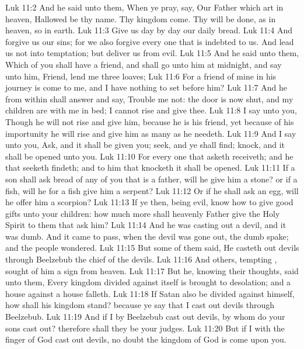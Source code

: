 \vs Luk 11:2 And he said unto them, When ye pray, say, Our Father which art in heaven, Hallowed be thy name. Thy kingdom come. Thy will be done, as in heaven, so in earth.
\vs Luk 11:3 Give us day by day our daily bread.
\vs Luk 11:4 And forgive us our sins; for we also forgive every one that is indebted to us. And lead us not into temptation; but deliver us from evil.
\vs Luk 11:5 And he said unto them, Which of you shall have a friend, and shall go unto him at midnight, and say unto him, Friend, lend me three loaves;
\vs Luk 11:6 For a friend of mine in his journey is come to me, and I have nothing to set before him?
\vs Luk 11:7 And he from within shall answer and say, Trouble me not: the door is now shut, and my children are with me in bed; I cannot rise and give thee.
\vs Luk 11:8 I say unto you, Though he will not rise and give him, because he is his friend, yet because of his importunity he will rise and give him as many as he needeth.
\vs Luk 11:9 And I say unto you, Ask, and it shall be given you; seek, and ye shall find; knock, and it shall be opened unto you.
\vs Luk 11:10 For every one that asketh receiveth; and he that seeketh findeth; and to him that knocketh it shall be opened.
\vs Luk 11:11 If a son shall ask bread of any of you that is a father, will he give him a stone? or if  a fish, will he for a fish give him a serpent?
\vs Luk 11:12 Or if he shall ask an egg, will he offer him a scorpion?
\vs Luk 11:13 If ye then, being evil, know how to give good gifts unto your children: how much more shall  heavenly Father give the Holy Spirit to them that ask him?
\vs Luk 11:14 And he was casting out a devil, and it was dumb. And it came to pass, when the devil was gone out, the dumb spake; and the people wondered.
\vs Luk 11:15 But some of them said, He casteth out devils through Beelzebub the chief of the devils.
\vs Luk 11:16 And others, tempting , sought of him a sign from heaven.
\vs Luk 11:17 But he, knowing their thoughts, said unto them, Every kingdom divided against itself is brought to desolation; and a house  against a house falleth.
\vs Luk 11:18 If Satan also be divided against himself, how shall his kingdom stand? because ye say that I cast out devils through Beelzebub.
\vs Luk 11:19 And if I by Beelzebub cast out devils, by whom do your sons cast  out? therefore shall they be your judges.
\vs Luk 11:20 But if I with the finger of God cast out devils, no doubt the kingdom of God is come upon you.
